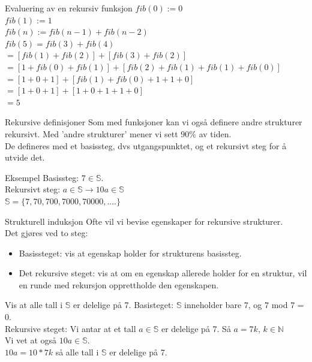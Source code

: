 \begin{frame}{Evaluering av en rekursiv funksjon}
    $fib(0) := 0$\\
    $fib(1) := 1$\\
    $fib(n) := fib(n-1) + fib(n-2)$\\
    
    \pause
    $fib(5) = fib(3) + fib(4)$\\
    $ = [fib(1) + fib(2)] + [fib(3) + fib(2)]$\\
    $ = [1 + fib(0) + fib(1)] + [fib(2) + fib(1) + fib(1) + fib(0)]$\\
    $ = [1 + 0 + 1] + [fib(1) + fib(0) + 1 + 1 + 0]$\\
    $ = [1 + 0 + 1] + [1 + 0 + 1 + 1 + 0]$\\
    $ = 5$
\end{frame}

\begin{frame}{Rekursive definisjoner}
    Som med funksjoner kan vi også definere andre strukturer rekursivt. Med 'andre strukturer' mener vi sett 90\% av tiden.\\
    
    De defineres med et basissteg, dvs utgangspunktet, og et rekursivt steg for å utvide det.\\
    
    \pause
    \begin{block}{Eksempel}
        Basissteg: $7 \in \mathbb{S}$.\\
        Rekursivt steg: $a \in \mathbb{S} \rightarrow 10a \in \mathbb{S}$\\
        $\mathbb{S} = \{7, 70, 700, 7000, 70000, ....\}$
    \end{block}
\end{frame}

\begin{frame}{Strukturell induksjon}
    Ofte vil vi bevise egenskaper for rekursive strukturer.\\
    Det gjøres ved to steg:\\
    \begin{itemize}
        \item Basissteget: vis at egenskap holder for strukturens basissteg.
        \item Det rekursive steget: vis at om en egenskap allerede holder for en struktur, vil en runde med rekursjon opprettholde den egenskapen.
    \end{itemize}
    
    \pause
    \begin{block}{Vis at alle tall i $\mathbb{S}$ er delelige på 7.}
        Basisteget: $\mathbb{S}$ inneholder bare $7$, og $7$ mod $7$ = 0. \checkmark\\
        Rekursive steget: Vi antar at et tall $a \in \mathbb{S}$ er delelige på 7. Så $a = 7k$, $k \in \mathbb{N}$\\
        Vi vet at også $10a \in \mathbb{S}$.\\
        $10a=10 * 7k$ så alle tall i $\mathbb{S}$ er delelige på 7.\checkmark
    \end{block}
\end{frame}

